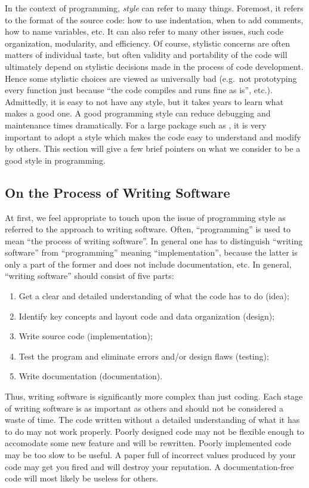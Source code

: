 % 
%
%
%
%
%

In the context of programming, {\em style} can refer to many
things. Foremost, it refers to the format of the source code: how to
use indentation, when to add comments, how to name variables, etc.  It
can also refer to many other issues, such code organization,
modularity, and efficiency.  Of course, stylistic concerns are often
matters of individual taste, but often validity and portability of the
code will ultimately depend on stylistic decisions made in the process
of code development.  Hence some stylistic choices are viewed as
universally bad (e.g.\ not prototyping every function just because
``the code compiles and runs fine as is'', etc.).  Admittedly, it is
easy to not have any style, but it takes years to learn what makes a
good one. A good programming style can reduce debugging and
maintenance times dramatically.  For a large package such as
\PSIthree, it is very important to adopt a style which makes the code
easy to understand and modify by others.  This section will give a few
brief pointers on what we consider to be a good style in programming.

\subsection{On the Process of Writing Software}
At first, we feel appropriate to touch upon the issue of programming
style as referred to the approach to writing software. Often,
``programming'' is used to mean ``the process of writing
software''. In general one has to distinguish ``writing software''
from ``programming'' meaning ``implementation'', because the latter is
only a part of the former and does not include documentation, etc.  In
general, ``writing software'' should consist of five parts:
\begin{enumerate}
\item Get a clear and detailed understanding of what the code has to do (idea);
\item Identify key concepts and layout code and data organization (design);
\item Write source code (implementation);
\item Test the program and eliminate errors and/or design flaws (testing);
\item Write documentation (documentation).
\end{enumerate}
Thus, writing software is significantly more complex than just
coding. Each stage of writing software is as important as others and
should not be considered a waste of time.  The code written without a
detailed understanding of what it has to do may not work
properly. Poorly designed code may not be flexible enough to
accomodate some new feature and will be rewritten.  Poorly implemented
code may be too slow to be useful.  A paper full of incorrect values
produced by your code may get you fired and will destroy your
reputation. A documentation-free code will most likely be useless for
others.

